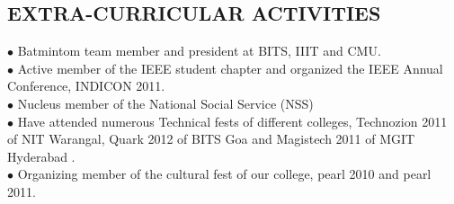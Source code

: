 \documentclass[7pt]{article}
\begin{document}
\begin{small}
\vspace{-4 mm}
\section{EXTRA-CURRICULAR ACTIVITIES} 
$\bullet$ Batmintom team member and president at BITS, IIIT and CMU.\\
$\bullet$ Active member of the IEEE student chapter and organized the IEEE Annual Conference, INDICON 2011.\\
$\bullet$ Nucleus member of the National Social Service (NSS) \\
$\bullet$ Have attended numerous Technical fests of different colleges, Technozion 2011 of NIT Warangal, Quark 2012 of BITS Goa and Magistech 2011 of MGIT Hyderabad .\\
$\bullet$ Organizing member of the cultural fest of our college, pearl 2010 and pearl 2011.\\


\end{small}
\end{document}
